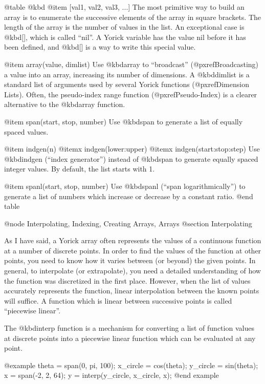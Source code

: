 @table @kbd
@item [val1, val2, val3, ...]
The most primitive way to build an array is to enumerate the successive
elements of the array in square brackets.  The length of the array is
the number of values in the list.  An exceptional case is @kbd{[]},
which is called ``nil''.  A Yorick variable has the value nil before
it has been defined, and @kbd{[]} is a way to write this special value.


@item array(value, dimlist)
Use @kbd{array} to ``broadcast'' (@pxref{Broadcasting}) a value into an
array, increasing its number of dimensions.  A @kbd{dimlist} is a
standard list of arguments used by several Yorick functions
(@pxref{Dimension Lists}).  Often, the pseudo-index range function
(@pxref{Pseudo-Index}) is a clearer alternative to the @kbd{array}
function.

@item span(start, stop, number)
Use @kbd{span} to generate a list of equally spaced values.

@item indgen(n)
@itemx indgen(lower:upper)
@itemx indgen(start:stop:step)
Use @kbd{indgen} (``index generator'') instead of @kbd{span} to generate
equally spaced integer values.  By default, the list starts with 1.

@item spanl(start, stop, number)
Use @kbd{spanl} (``span logarithmically'') to generate a list of numbers
which increase or decrease by a constant ratio.
@end table

@node    Interpolating, Indexing, Creating Arrays, Arrays
@section Interpolating

As I have said, a Yorick array often represents the values of a
continuous function at a number of discrete points.  In order to find
the values of the function at other points, you need to know how it
varies between (or beyond) the given points.  In general, to interpolate
(or extrapolate), you need a detailed understanding of how the function
was discretized in the first place.  However, when the list of values
accurately represents the function, linear interpolation between the
known points will suffice.  A function which is linear between
successive points is called ``piecewise linear''.

The @kbd{interp} function is a mechanism for converting a list of
function values at discrete points into a piecewise linear function
which can be evaluated at any point.

@example
theta = span(0, pi, 100);
x_circle = cos(theta);
y_circle = sin(theta);
x = span(-2, 2, 64);
y = interp(y_circle, x_circle, x);
@end example

